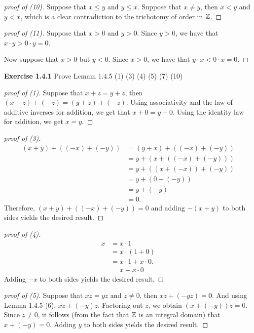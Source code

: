 \begin{proof}[proof of (10)]
    Suppose that \(x \leq y\) and \(y \leq x\). Suppose that \(x \neq y\), then \(x < y\) and \(y < x\), which is a clear contradiction to the trichotomy of order in \(\mathbb{Z}\).
\end{proof}
\begin{proof}[proof of (11)]
    Suppose that \(x > 0\) and \(y > 0\). Since \(y > 0\), we have that \(x \cdot y > 0 \cdot y = 0\).
    \par Now suppose that \(x > 0\) but \(y < 0\). Since \(x > 0\), we have that \(y \cdot x < 0 \cdot x = 0\).
\end{proof}


\newpage

\noindent \textbf{Exercise 1.4.1} Prove Lemam 1.4.5 (1) (3) (4) (5) (7) (10)
\begin{proof}[proof of (1)]
    Suppose that \(x + z = y + z\), then \((x + z) + (-z) = (y + z) + (-z)\). Using associativity and the law of additive inverses for addition, we get that \(x + 0 = y + 0\). Using the identity law for addition, we get \(x = y\).
\end{proof}
\begin{proof}[proof of (3)]
    \begin{align*}
        (x+y) + ((-x) + (-y)) &= (y+x) + ((-x) + (-y)) \\
        &= y + (x + ((-x) + (-y))) \\
        &= y + ((x + (-x)) + (-y)) \\
        &= y + (0 + (-y)) \\
        &= y + (-y) \\
        &= 0.
    \end{align*}
    Therefore, \((x+y) + ((-x) + (-y)) = 0\) and adding \(-(x+y)\) to both sides yields the desired result.
\end{proof}
\begin{proof}[proof of (4)]
    \begin{align*}
        x &= x \cdot 1 \\
        &= x \cdot (1 + 0) \\
        &= x \cdot 1 + x \cdot 0.\\
        &= x + x \cdot 0
    \end{align*}
    Adding \(-x\) to both sides yields the desired result.
\end{proof}
\begin{proof}[proof of (5)]
    Suppose that \(xz = yz\) and \(z \neq 0\), then \(xz + (-yz) = 0\). And using Lemma 1.4.5 (6), \(xz + (-y)z\). Factoring out \(z\), we obtain \((x+(-y))z = 0\). Since \(z \neq 0\), it follows (from the fact that \(\mathbb{Z}\) is an integral domain) that \(x+ (-y) = 0\). Adding \(y\) to both sides yields the desired result.
\end{proof}
